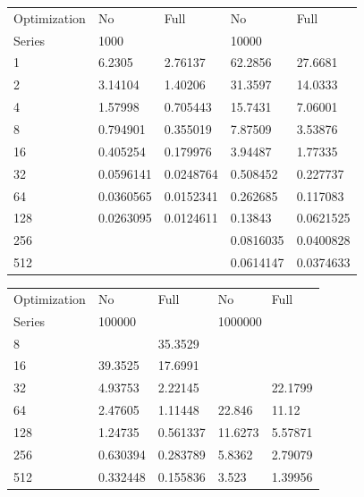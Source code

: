 \documentclass[a4paper,12pt,titlepage,finall]{article}
\begin{document}
\begin{table}[h]
\begin{tabular}{lllll}
Optimization & No          & Full       & No          & Full        \\
Series       & \multicolumn{2}{l}{1000} & \multicolumn{2}{l}{10000} \\
1            & 6.2305      & 2.76137    & 62.2856     & 27.6681     \\
2            & 3.14104     & 1.40206    & 31.3597     & 14.0333     \\
4            & 1.57998     & 0.705443   & 15.7431     & 7.06001     \\
8            & 0.794901    & 0.355019   & 7.87509     & 3.53876     \\
16           & 0.405254    & 0.179976   & 3.94487     & 1.77335     \\
32           & 0.0596141   & 0.0248764  & 0.508452    & 0.227737    \\
64           & 0.0360565   & 0.0152341  & 0.262685    & 0.117083    \\
128          & 0.0263095   & 0.0124611  & 0.13843     & 0.0621525   \\
256          &             &            & 0.0816035   & 0.0400828   \\
512          &             &            & 0.0614147   & 0.0374633  
\end{tabular}
\end{table}
\begin{table}[h]
\begin{tabular}{lllll}
Optimization & No           & Full        & No           & Full         \\
Series       & \multicolumn{2}{l}{100000} & \multicolumn{2}{l}{1000000} \\
8            &              & 35.3529     &              &              \\
16           & 39.3525      & 17.6991     &              &              \\
32           & 4.93753      & 2.22145     &              & 22.1799      \\
64           & 2.47605      & 1.11448     & 22.846       & 11.12        \\
128          & 1.24735      & 0.561337    & 11.6273      & 5.57871      \\
256          & 0.630394     & 0.283789    & 5.8362       & 2.79079      \\
512          & 0.332448     & 0.155836    & 3.523        & 1.39956     
\end{tabular}
\end{table}
\end{document}
